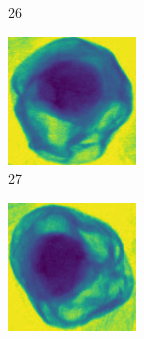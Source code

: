 \documentclass[11pt]{article}
\begin{document}
\begin{figure}[!h]
\begin{subfigure}[b]{0.22\textwidth}
         \caption{26}
         \label{fig:avo_25}
     \end{subfigure}
     \hfill
     \begin{subfigure}[b]{0.22\textwidth}
         \centering
         \includegraphics[width=\textwidth]{figurer/avocado_dataset/avo_26.jpg}
         \caption{27}
         \label{fig:avo_26}
     \end{subfigure}
     \hfill
     \begin{subfigure}[b]{0.22\textwidth}
         \centering
         \includegraphics[width=\textwidth]{figurer/avocado_dataset/avo_27.jpg}

\end{subfigure}
\end{figure}
\end{document}
